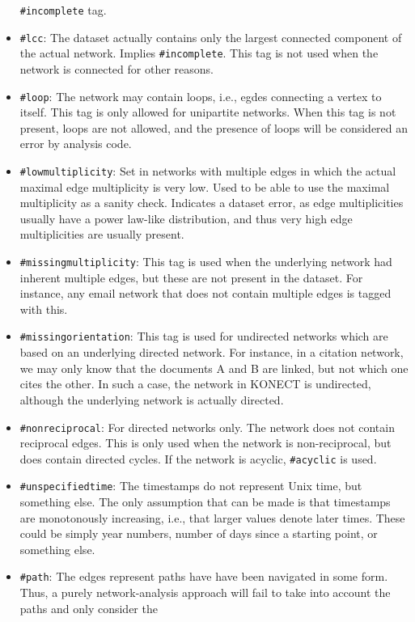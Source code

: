 \documentclass{article}
\begin{document}
\begin{itemize}
  \texttt{\#incomplete} tag.
\item \texttt{\#lcc}:  The dataset actually contains only the
  largest connected component of the actual network.  Implies
  \texttt{\#incomplete}.  This tag is not used when the network
  is connected for other reasons. 
\item \texttt{\#loop}: The network may contain loops, i.e.,
  egdes connecting a vertex to itself.  This tag is only
  allowed for unipartite networks.  When this tag is not
  present, loops are not allowed, and the presence of loops
  will be considered an error by analysis code.
\item \texttt{\#lowmultiplicity}:  Set in networks with multiple
  edges in which the actual maximal edge multiplicity is very
  low.  Used to be able to use the maximal multiplicity as a
  sanity check.  Indicates a dataset error, as edge
  multiplicities usually have a power law-like distribution, and
  thus very high edge multiplicities are usually present. 
\item \texttt{\#missingmultiplicity}:  This tag is used when the
  underlying network had inherent multiple edges, but these are
  not present in the dataset.  For instance, any email network
  that does not contain multiple edges is tagged with this. 
\item \texttt{\#missingorientation}: This tag is used for
  undirected networks which are based on an underlying
  directed network.  For instance, in a citation network, we
  may only know that the documents A and B are linked, but not
  which one cites the other.  In such a case, the network in
  KONECT is undirected, although the underlying network is
  actually directed.
\item \texttt{\#nonreciprocal}:  For directed networks only.
  The network does not contain reciprocal edges.  This is only
  used when the network is non-reciprocal, but does contain
  directed cycles.  If the network is acyclic,
  \texttt{\#acyclic} is used. 
\item \texttt{\#unspecifiedtime}:  The timestamps do not represent Unix
  time, but something else.  The only assumption that can be made is
  that timestamps are monotonously increasing, i.e., that larger values
  denote later times.  These could be simply year numbers, number of
  days since a starting point, or something else. 
\item \texttt{\#path}:  The edges represent paths have have been
  navigated in some form.  Thus, a purely network-analysis approach will
  fail to take into account the paths and only consider the

\end{itemize}
\end{document}
